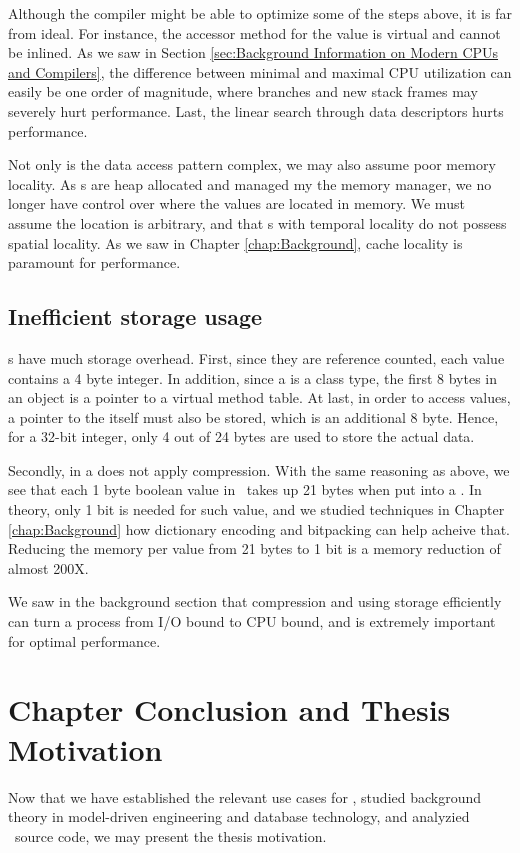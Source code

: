 Although the compiler might be able to optimize some of the steps above, it is far from ideal. For instance, the accessor method for the value is virtual and cannot be inlined. As we saw in Section \ref{sec:Background Information on Modern CPUs and Compilers}, the difference between minimal and maximal CPU utilization can easily be one order of magnitude, where branches and new stack frames may severely hurt performance. Last, the linear search through data descriptors hurts performance.

Not only is the data access pattern complex, we may also assume poor memory locality. As s are heap allocated and managed my the memory manager, we no longer have control over where the values are located in memory. We must assume the location is arbitrary, and that s with temporal locality do not possess spatial locality. As we saw in Chapter \ref{chap:Background}, cache locality is paramount for performance.

\subsection{Inefficient storage usage}
\label{sub:Inefficient storage usage}
s have much storage overhead. First, since they are reference counted, each value contains a 4 byte integer. In addition, since a  is a class type, the first 8 bytes in an object is a pointer to a virtual method table. At last, in order to access values, a pointer to the  itself must also be stored, which is an additional 8 byte. Hence, for a 32-bit integer, only 4 out of 24 bytes are used to store the actual data.

Secondly,  in a  does not apply compression. With the same reasoning as above, we see that each 1 byte boolean value in \gap~takes up 21 bytes when put into a . In theory, only 1 bit is needed for such value, and we studied techniques in Chapter \ref{chap:Background} how dictionary encoding and bitpacking can help acheive that. Reducing the memory per value from 21 bytes to 1 bit is a memory reduction of almost 200X.

We saw in the background section that compression and using storage efficiently can turn a process from I/O bound to CPU bound, and is extremely important for optimal performance.

\section{Chapter Conclusion and Thesis Motivation}
\label{sec:Chapter Conclusion and Thesis Motivation}
Now that we have established the relevant use cases for \genus, studied background theory in model-driven engineering and database technology, and analyzied \gap~source code, we may present the thesis motivation.

